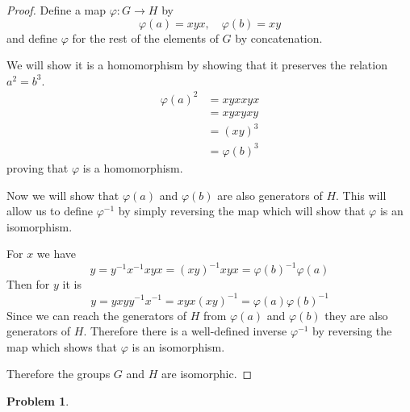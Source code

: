 \documentclass[10pt]{article}
\newcommand{\sk}{\vskip 10mm}
\theoremstyle{plain}
\newtheorem{problem}{Problem}
\theoremstyle{remark}
\begin{document}
\begin{proof}
  Define a map $\varphi:G\rightarrow H$ by
  \[ \varphi(a)=xyx,\quad \varphi(b)=xy\]
  and define $\varphi$ for the rest of the elements of $G$ by concatenation.

  We will show it is a homomorphism by showing that it preserves the relation
  $a^2=b^3$.
  \begin{align*}
    \varphi(a)^2&= xyxxyx\\
         &= xyxyxy\\
         &= (xy)^3\\
         &= \varphi(b)^3
  \end{align*}
  proving that $\varphi$ is a homomorphism.

  Now we will show that $\varphi(a)$ and $\varphi(b)$ are also generators of $H$. This
  will allow us to define $\varphi^{-1}$ by simply reversing the map which will
  show that $\varphi$ is an isomorphism.

  For $x$ we have
  \[ y = y^{-1}x^{-1}xyx = (xy)^{-1}xyx = \varphi(b)^{-1}\varphi(a)\]
  Then for $y$ it is
  \[ y = yxyy^{-1}x^{-1}=xyx(xy)^{-1} =\varphi(a)\varphi(b)^{-1}\]
  Since we can reach the generators of $H$ from $\varphi(a)$
  and $\varphi(b)$ they are also generators of $H$. 
  Therefore there is a well-defined
  inverse $\varphi^{-1}$ by reversing the map which shows
  that $\varphi$ is an isomorphism.

  Therefore the groups $G$ and $H$ are isomorphic.
\end{proof}

\sk

\begin{problem} %
  
\end{problem}
\end{document}
